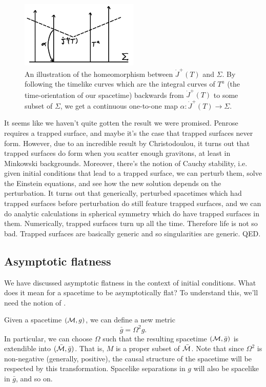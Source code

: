 \begin{figure}
    \centering
    \includegraphics[width=0.5\textwidth]{2019/02/20190222_jplushomeomorphism.png}
    \caption{An illustration of the homeomorphism between $\dot J^+(T)$ and $\Sigma$. By following the timelike curves which are the integral curves of $T^a$ (the time-orientation of our spacetime) backwards from $\dot J^+(T)$ to some subset of $\Sigma$, we get a continuous one-to-one map $\alpha: \dot J^+(T)\to \Sigma$.}
    \label{fig:jplushomeomorphism}
\end{figure}

It seems like we haven't quite gotten the result we were promised. Penrose requires a trapped surface, and maybe it's the case that trapped surfaces never form. However, due to an incredible result by Christodoulou, it turns out that trapped surfaces do form when you scatter enough gravitons, at least in Minkowski backgrounds. Moreover, there's the notion of Cauchy stability, i.e. given initial conditions that lead to a trapped surface, we can perturb them, solve the Einstein equations, and see how the new solution depends on the perturbation. It turns out that generically, perturbed spacetimes which had trapped surfaces before perturbation do still feature trapped surfaces, and we can do analytic calculations in spherical symmetry which do have trapped surfaces in them. Numerically, trapped surfaces turn up all the time. Therefore life is not so bad. Trapped surfaces are basically generic and so singularities are generic. QED.

\subsection*{Asymptotic flatness}
We have discussed asymptotic flatness in the context of initial conditions. What does it mean for a spacetime to be asymptotically flat? To understand this, we'll need the notion of .

Given a spacetime $(\mathcal{M},g)$, we can define a new metric
\begin{equation}
    \bar g= \Omega^2 g.
\end{equation}
In particular, we can choose $\Omega$ such that the resulting spacetime $(\mathcal{M},\bar g)$ is extendible into $(\bar {\mathcal{M}},\bar g)$. That is, $M$ is a proper subset of $\bar {\mathcal{M}}$. Note that since $\Omega^2$ is non-negative (generally, positive), the causal structure of the spacetime will be respected by this transformation. Spacelike separations in $g$ will also be spacelike in $\bar g$, and so on. 

